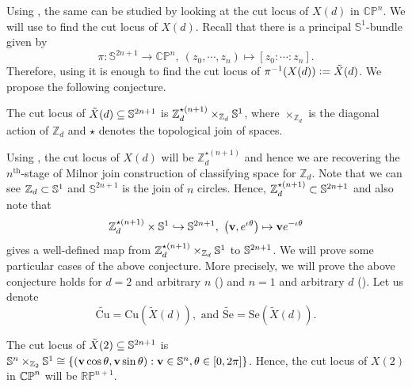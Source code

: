 \vspace{0.3cm}
\noindent Using , the same can be studied by looking at the cut locus of $X(d)$ in $\mathbb{CP}^n$. We will use  to find the cut locus of $X(d)$. Recall that there is a principal $\mathbb{S}^1$-bundle given by
\begin{displaymath}
	\pi:\mathbb{S}^{2n+1}\to \mathbb{CP}^n,~ (z_0,\cdots,z_n)\mapsto [z_0:\cdots:z_n].
\end{displaymath} 
Therefore, using  it is enough to find the cut locus of $\pi^{-1}(X(d))\vcentcolon= \tilde{X}(d)$. We propose the following conjecture.

\begin{conj}\label{conj:cut-locus-of_X(d)}
	The cut locus of $\tilde{X}(d)\subseteq \mathbb{S}^{2n+1}$ is $\mathbb{Z}_d^{\star(n+1)}\times_{\mathbb{Z}_d}\mathbb{S}^1$, where $\times_{\mathbb{Z}_d}$ is the diagonal action of $\mathbb{Z}_d$ and $\star$ denotes the topological join of spaces.  
\end{conj}

\vspace{0.3cm}
\noindent Using , the cut locus of $X(d)$ will be $\mathbb{Z}_d^{\star(n+1)}$ and hence we are recovering the $n^{\text{th}}$-stage of Milnor join construction of classifying space for $\mathbb{Z}_d$. Note that we can see $\mathbb{Z}_d\subset \mathbb{S}^1$ and $\mathbb{S}^{2n+1}$ is the join of $n$ circles. Hence, $\mathbb{Z}_d^{\star(n+1)}\subset \mathbb{S}^{2n+1}$ and also note that 
\begin{displaymath}
	 \mathbb{Z}_d^{\star(n+1)} \times \mathbb{S}^1 \hookrightarrow \mathbb{S}^{2n+1},~ \left(\mathbf{v},e^{\iota\theta}\right) \mapsto \mathbf{v} e^{-\iota\theta}
\end{displaymath}
gives a well-defined map from $\mathbb{Z}_d^{\star(n+1)} \times_{\mathbb{Z}_d}\mathbb{S}^1$ to $\mathbb{S}^{2n+1}$. We will prove some particular cases of the above conjecture. More precisely, we will prove the above conjecture holds for $d=2$ and arbitrary $n$ () and $n=1$ and  arbitrary $d$ (). Let us denote 
\begin{displaymath}
	\widetilde{\mathrm{Cu}}= \mathrm{Cu} (\tilde{X}(d)),\text{ and } \widetilde{\mathrm{Se}}= \mathrm{Se} (\tilde{X}(d)).
\end{displaymath}

\begin{thm} \label{thm:cut-locus-of_Xn_2}
	The cut locus of $\tilde{X}(2)\subseteq \mathbb{S}^{2n+1}$ is $\mathbb{S}^{n}\times_{\mathbb{Z}_2}\mathbb{S}^1\cong \{(\mathbf{v}\cos \theta,\mathbf{v}\sin\theta):\mathbf{v}\in \mathbb{S}^n,\theta\in [0,2\pi]\}$. Hence, the cut locus of $X(2)$ in $\mathbb{CP}^{n}$ will be $\mathbb{RP}^{n+1}$.
\end{thm}

